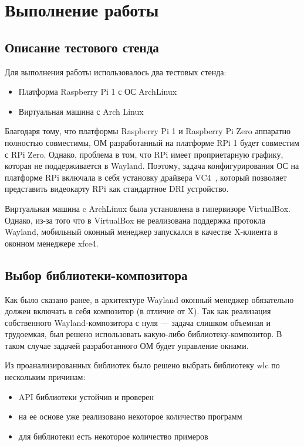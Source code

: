 \section{Выполнение работы}
\subsection{Описание тестового стенда}
Для выполнения работы использовалось два тестовых стенда:
\begin{itemize}
\item Платформа Raspberry Pi 1 с ОС ArchLinux
\item Виртуальная машина с Arch Linux
\end{itemize}

Благодаря тому, что платформы Raspberry Pi 1 и Raspberry Pi Zero аппаратно полностью совместимы, ОМ разработанный на платформе RPi 1 будет совместим с RPi Zero. Однако, проблема в том, что RPi имеет проприетарную графику, которая не поддерживается в Wayland. Поэтому, задача конфигурирования ОС на платформе RPi включала в себя установку драйвера VC4~\cite{vc4}, который позволяет представить видеокарту RPi как стандартное DRI устройство.

Виртуальная машина c ArchLinux была установлена в гипервизоре VirtualBox. Однако, из-за того что в VirtualBox не реализована поддержка протокла Wayland, мобильный оконный менеджер запускался в качестве X-клиента в оконном менеджере xfce4.

\subsection{Выбор библиотеки-композитора}
Как было сказано ранее, в архитектуре Wayland оконный менеджер обязательно должен включать в себя композитор (в отличие от X). Так как реализация собственного Wayland-композитора с нуля --- задача слишком объемная и трудоемкая, был решено использовать какую-либо библиотеку-композитор. В таком случае задачей разработанного ОМ будет управление окнами.

Из проанализированных библиотек было решено выбрать библиотеку wlc по нескольким причинам:
\begin{itemize}
\item API библиотеки устойчив и проверен
\item на ее основе уже реализовано некоторое количество программ
\item для библиотеки есть некоторое количество примеров
\end{itemize}

